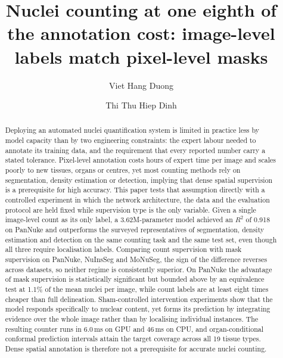 \documentclass[preprint,12pt]{elsarticle}
\begin{document}
\begin{frontmatter}

\title{Nuclei counting at one eighth of the annotation cost:
image-level labels match pixel-level masks}

\author[uit]{Viet Hang Duong}

\author[uit]{Thi Thu Hiep Dinh}


\begin{abstract}
Deploying an automated nuclei quantification system is limited in practice less by model capacity than by two
engineering constraints: the expert labour needed to annotate its training data, and the requirement that every
reported number carry a stated tolerance. Pixel-level annotation costs hours of expert time per image and scales
poorly to new tissues, organs or centres, yet most counting methods rely on segmentation, density estimation or
detection, implying that dense spatial supervision is a prerequisite for high accuracy. This paper tests that
assumption directly with a controlled experiment in which the network architecture, the data and the evaluation
protocol are held fixed while supervision type is the only variable. Given a single image-level count as its only
label, a 3.62M-parameter model achieved an $R^2$ of 0.918 on PanNuke and outperforms the surveyed representatives
of segmentation, density estimation and detection on the same counting task and the same test set, even though all
three require localisation labels. Comparing count supervision with mask supervision on PanNuke, NuInsSeg and
MoNuSeg, the sign of the difference reverses across datasets, so neither regime is consistently superior. On
PanNuke the advantage of mask supervision is statistically significant but bounded above by an equivalence test at
1.1\% of the mean nuclei per image, while count labels are at least eight times cheaper than full delineation.
Sham-controlled intervention experiments show that the model responds specifically to nuclear content, yet forms
its prediction by integrating evidence over the whole image rather than by localising individual instances. The
resulting counter runs in $6.0$\,ms on GPU and $46$\,ms on CPU, and organ-conditional conformal prediction
intervals attain the target coverage across all 19 tissue types. Dense spatial annotation is therefore not a
prerequisite for accurate nuclei counting.
\end{abstract}


\end{frontmatter}
\end{document}

